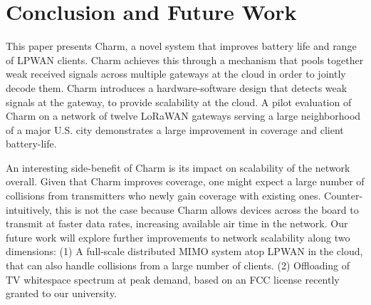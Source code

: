 \section{Conclusion and Future Work}
\label{sec:conclusion}

This paper presents Charm, a novel system that improves battery life and range
of LPWAN clients. Charm achieves this through a mechanism that pools together
weak received signals across multiple gateways at the cloud in order to
jointly decode them. Charm introduces a hardware-software design that detects
weak signals at the gateway, to provide scalability at the cloud. A pilot
evaluation of Charm on a network of twelve LoRaWAN gateways serving a large
neighborhood of a major U.S. city demonstrates a large improvement in coverage
and client battery-life.

An interesting side-benefit of Charm is its impact on scalability of the
network overall. Given that Charm improves coverage, one might expect a large
number of collisions from transmitters who newly gain coverage with existing
ones. Counter-intuitively, this is not the case because Charm allows devices
across the board to transmit at faster data rates, increasing available air
time in the network. Our future work will explore further improvements to
network scalability along two dimensions: (1) A full-scale distributed MIMO
system atop LPWAN in the cloud, that can also handle collisions from a large
number of clients. (2) Offloading of TV whitespace spectrum at peak demand,
based on an FCC license recently granted to our university.



